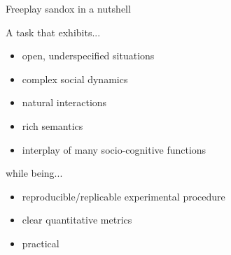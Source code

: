 \documentclass[xcolor=table]{beamer}
\begin{document}



\begin{frame}{Freeplay sandox in a nutshell}

    A task that exhibits...

    \begin{itemize}
        \item open, underspecified situations
            \item complex social dynamics
            \item natural interactions
            \item rich semantics
            \item interplay of many socio-cognitive functions
    \end{itemize}

    \pause

    while being...
    \begin{itemize}
        \item reproducible/replicable experimental procedure
        \item clear quantitative metrics
        \item practical
    \end{itemize}
\end{frame}
\end{document}
